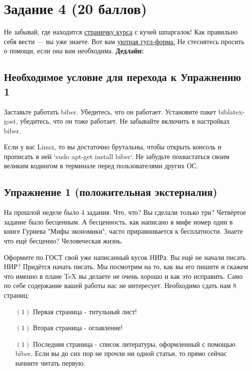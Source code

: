 \documentclass[12pt, a4paper, oneside]{article}
\begin{document}
	
	\section*{Задание 4  (20 баллов)  }
	
	Не забывай, где находится  \href{https://fulyankin.github.io/LaTeX/}{страничку курса} с кучей шпаргалок! Как правильно себя вести — вы уже знаете. Вот вам \href{https://docs.google.com/forms/d/e/1FAIpQLSe11kxKVfv07iCL1E9yNX7ll9swKImiVwRr1H70lslGzInRSg/viewform}{уютная гугл-форма.}   Не стеснятесь просить о помощи, если она вам необходима. \textbf{Дедлайн:  } 
	
	

\subsection*{Необходимое условие для перехода к Упражнению 1 }

Заставьте работать biber. Убедитесь, что он работает. Установите пакет biblatex-gost, убедитесь, что он тоже работает. Не забывайте включить в настройках biber.

Если у вас Linux, то вы достаточно брутальны, чтобы открыть консоль и прописать в ней `sudo apt-get install biber`. Не забудьте похвастаться своим великим кодингом в терминале перед пользователями других ОС.

\subsection*{Упражнение 1  (положительная экстерналия)}

На прошлой неделе было 4 задания. Что, что? Вы сделали только три? Четвёртое задание было бесценным. 
А бесценность, как написано в мифе номер один в книге Гуриева "Мифы экономики", часто приравнивается к бесплатности. Знаете что ещё бесценно? Человеческая жизнь. 

Оформите по ГОСТ свой уже написанный кусок НИРа. Вы ещё не начали писать НИР? Придётся начать писать. Мы посмотрим на то, как вы его пишите и скажем что именно в плане TeX вы делаете не очень хорошо и как это исправить. Само по себе содержание вашей работы нас не интересует. Необходимо сдать нам 8 страниц:

\begin{itemize} 
\item[$(1)$] Первая страница - титульный лист!

\item[$(1)$]  Вторая страница - оглавление!

\item[$(1)$]  Последняя страница - список литературы, оформленный с помощью biber. Если вы до сих пор не прочли ни одной статьи, то прямо сейчас начните читать первую.
\end{itemize} 
\end{document}
